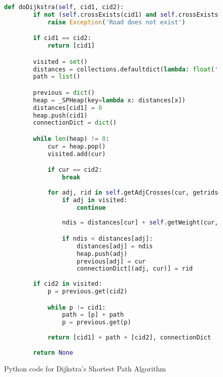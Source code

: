 \documentclass[a4paper]{article}
\begin{document}
\begin{figure}[h!]
    \begin{lstlisting}[language=Python]
        def doDijkstra(self, cid1, cid2):
        if not (self.crossExists(cid1) and self.crossExists(cid2)):
            raise Exception('Road does not exist')

        if cid1 == cid2:
            return [cid1]

        visited = set()
        distances = collections.defaultdict(lambda: float('inf'))
        path = list()

        previous = dict()
        heap = _SPHeap(key=lambda x: distances[x])
        distances[cid1] = 0
        heap.push(cid1)
        connectionDict = dict()

        while len(heap) != 0:
            cur = heap.pop()
            visited.add(cur)

            if cur == cid2:
                break
            
            for adj, rid in self.getAdjCrosses(cur, getrids=True):
                if adj in visited:
                    continue
                
                ndis = distances[cur] + self.getWeight(cur, adj)

                if ndis < distances[adj]:
                    distances[adj] = ndis
                    heap.push(adj)
                    previous[adj] = cur
                    connectionDict[(adj, cur)] = rid
        
        if cid2 in visited:
            p = previous.get(cid2)

            while p != cid1:
                path = [p] + path
                p = previous.get(p)
            
            return [cid1] + path + [cid2], connectionDict
        
        return None
    \end{lstlisting}
    \caption{Python code for Dijkstra's Shortest Path Algorithm}
    \label{code}
\end{figure}



\printbibliography
\end{document}
